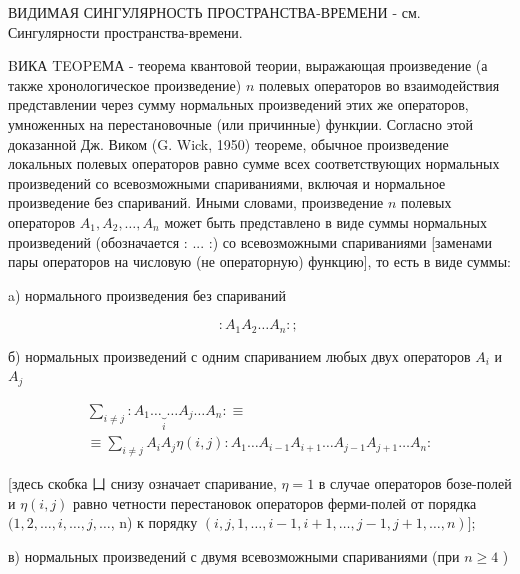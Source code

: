 \documentclass[10pt]{article}
\begin{document}
ВИДИМАЯ СИНГУЛЯРНОСТЬ ПРОСТРАНСТВА-ВРЕМЕНИ - см. Сингулярности пространства-времени.



BИКА TEOPEМА - теорема квантовой теории, выражающая произведение (а также хронологическое произведение) $n$ полевых операторов во взаимодействия представлении через сумму нормальных произведений этих же операторов, умноженных на перестановочные (или причинные) функџии. Согласно этой доказанной Дж. Виком (G. Wick, 1950) теореме, обычное произведение локальных полевых операторов равно сумме всех соответствующих нормальных произведений со всевозможными спариваниями, включая и нормальное произведение без спариваний. Иными словами, произведение $n$ полевых операторов $A_{1}, A_{2}, \ldots, A_{n}$ может быть представлено в виде суммы нормальных произведений (обозначается : ... :) со всевозможными спариваниями [заменами пары операторов на числовую (не операторную) функцию], то есть в виде суммы:



a) нормального произведения без спариваний



\[

: A_{1} A_{2} \ldots A_{n}: \text {; }

\]



б) нормальных произведений с одним спариванием любых двух операторов $A_{i}$ и $A_{j}$



\[

\begin{gathered}

\sum_{i \neq j}: A_{1} \ldots \underbrace{}_{i} \ldots A_{j} \ldots A_{n}: \equiv \\

\equiv \sum_{i \neq j} A_{i} A_{j} \eta(i, j): A_{1} \ldots A_{i-1} A_{i+1} \ldots A_{j-1} A_{j+1} \ldots A_{n}:

\end{gathered}

\]



[здесь скобка $凵$ снизу означает спаривание, $\eta=1$ в случае операторов бозе-полей и $\eta(i, j)$ равно четности перестановок операторов ферми-полей от порядка $(1,2, \ldots, i, \ldots, j, \ldots$, n) к порядку $(i, j, 1, \ldots, i-1, i+1, \ldots, j-1, j+1, \ldots, n)]$;



в) нормальных произведений с двумя всевозможными спариваниями (при $n \geqslant 4$ )
\end{document}
